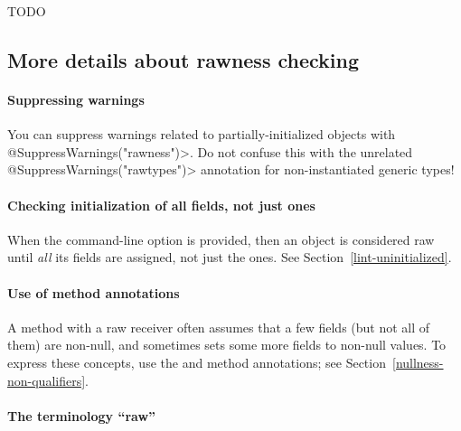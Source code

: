 TODO
\fi





\subsection{More details about rawness checking\label{rawness-checking}}


\paragraph{Suppressing warnings}

You can suppress warnings related to partially-initialized objects with
\<@SuppressWarnings("rawness")>.  Do not confuse this with the unrelated
\<@SuppressWarnings("rawtypes")> annotation for non-instantiated generic types!


\paragraph{Checking initialization of all fields, not just  ones}

When the  command-line option is provided, then
an object is considered raw until \emph{all} its fields are assigned, not
just the  ones.  See Section~\ref{lint-uninitialized}.


\paragraph{Use of method annotations}

A method with a raw receiver often assumes that a few fields (but not all
of them) are non-null, and sometimes sets some more fields to non-null
values.  To express these concepts, use the
 and
 method annotations;
see Section~\ref{nullness-non-qualifiers}.


\paragraph{The terminology ``raw''}

